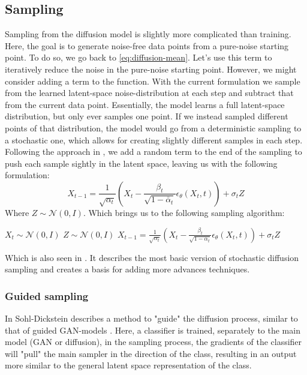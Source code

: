 \subsection{Sampling} \label{sec:sampling}
Sampling from the diffusion model is slightly more complicated than training. Here, the goal is to generate noise-free data points from a pure-noise starting point. To do so, we go back to \autoref{eq:diffusion-mean}. Let's use this term to iteratively reduce the noise in the pure-noise starting point. However, we might consider adding a term to the function. With the current formulation we sample from the learned latent-space noise-distribution at each step and subtract that from the current data point. Essentially, the model learns a full latent-space distribution, but only ever samples one point. If we instead sampled different points of that distribution, the model would go from a deterministic sampling to a stochastic one, which allows for creating slightly different samples in each step. Following the approach in \cite{ddpm}, we add a random term to the end of the sampling to push each sample sightly in the latent space, leaving us with the following formulation:
\begin{equation} \label{eq:sample}
    X_{t-1} = \frac{1}{\sqrt{\alpha_t}} \left( X_t - \frac{\beta_t}{\sqrt{1-\bar{\alpha}_t}} \epsilon_{\theta}(X_t,t) \right) + \sigma_t Z
\end{equation}
Where $Z \sim \mathcal{N}(0,I)$. Which brings us to the following sampling algorithm:
\begin{algorithm}
\caption{Sampling} \label{alg:base-sample}
\begin{algorithmic}[1]
    \State $X_t \sim \mathcal{N}(0,I)$
        \State $ Z \sim \mathcal{N}(0,I) $
        \State $ X_{t-1} = \frac{1}{\sqrt{\alpha_t}} \left( X_t - \frac{\beta_t}{\sqrt{1-\alpha_t}} \epsilon_{\theta}(X_t,t) \right) + \sigma_t Z $
    \EndFor
    \State {}
\end{algorithmic}
\end{algorithm}
Which is also seen in \cite{ddpm}. It describes the most basic version of stochastic diffusion sampling and creates a basis for adding more advances techniques.

\subsubsection{Guided sampling}

In \cite{org-diffusion} Sohl-Dickstein describes a method to "guide" the diffusion process, similar to that of guided GAN-models \cite{gan}. Here, a classifier is trained, separately to the main model (GAN or diffusion), in the sampling process, the gradients of the classifier will "pull" the main sampler in the direction of the class, resulting in an output more similar to the general latent space representation of the class.

